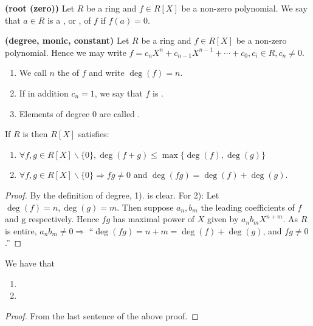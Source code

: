 \documentclass{article}
\newcommand{\bfs}[1]{\textbf{({#1}) }}
\begin{document}
\begin{defa}\bfs{root (zero)}
 Let $R$ be a ring and $f \in R[X]$ be a {non-zero polynomial}. We say that $a \in R$ is a , or , of $f$ if $f(a)=0$.
\end{defa}
\begin{defa}\bfs{degree, monic, constant}
 Let $R$ be a ring and $f \in R[X]$ be a non-zero polynomial. Hence we may write $f=c_{n} X^{n}+c_{n-1} X^{n-1}+\cdots+c_{0}, c_{i} \in R, c_{n} \neq 0$.\begin{enumerate}
     \item We call $n$ the  of $f$ and write $\deg(f)=n$.
     \item  If in addition $c_{n}=1$, we say that $f$ is . 
     \item Elements of degree $0$ are called .
 \end{enumerate} 
\end{defa}
\begin{thma}\label{thm:enafdz}
 If $R$ is  then $R[X]$ satisfies:
 \begin{enumerate}
     \item $\forall f, g \in R[X] \backslash\{0\}, \deg(f+g) \leq \max \{\deg(f), \deg(g)\}$
     \item $\forall f, g \in R[X] \backslash\{0\} \Rightarrow f g \neq 0$ and $\deg(f g)=\deg(f)+\deg(g)$.
 \end{enumerate}
\end{thma}
\begin{proof}
By the definition of degree, 1). is clear. For 2):
Let $\deg(f)=n, \deg(g)=m$. Then suppose $a_{n}, b_{m}$ the leading coefficients of $f$ and $\mathrm{g}$ respectively. Hence $f g$ has maximal power of $X$ given by $a_{n} b_{m} X^{n+m}$. As $R$ is entire, $a_{n} b_{m} \neq 0 \Rightarrow$ ``$ \deg(f g)=n+m=\deg(f)+\deg(g)$, and $f g \neq 0$.''
\end{proof}
\begin{cora}\label{cor:indgad}We have that
\begin{enumerate}
    \item {}
    \item {}
\end{enumerate}
\end{cora}
\begin{proof}
From the last sentence of the above proof.
\end{proof}
\end{document}
